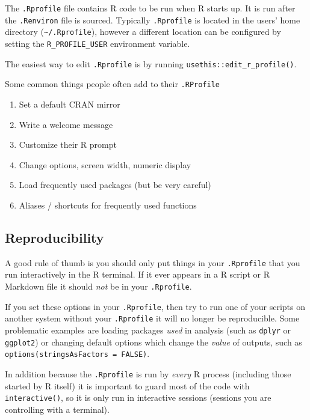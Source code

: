 \documentclass[
  letterpaper,
]{book}
\providecommand{\tightlist}{%
  \setlength{\itemsep}{0pt}\setlength{\parskip}{0pt}}\usepackage{longtable,booktabs,array}
\begin{document}
The \texttt{.Rprofile} file contains R code to be run when R starts up.
It is run after the \texttt{.Renviron} file is sourced. Typically
\texttt{.Rprofile} is located in the users' home directory
(\texttt{\textasciitilde{}/.Rprofile}), however a different location can
be configured by setting the \texttt{R\_PROFILE\_USER} environment
variable.

The easiest way to edit \texttt{.Rprofile} is by running
\texttt{usethis::edit\_r\_profile()}.

Some common things people often add to their \texttt{.RProfile}

\begin{enumerate}
\def\labelenumi{\arabic{enumi}.}
\tightlist
\item
  Set a default CRAN mirror
\item
  Write a welcome message
\item
  Customize their R prompt
\item
  Change options, screen width, numeric display
\item
  Load frequently used packages (but be very careful)
\item
  Aliases / shortcuts for frequently used functions
\end{enumerate}

\hypertarget{reproducibility}{%
\subsection{Reproducibility}\label{reproducibility}}

A good rule of thumb is you should only put things in your
\texttt{.Rprofile} that you run interactively in the R terminal. If it
ever appears in a R script or R Markdown file it should \emph{not} be in
your \texttt{.Rprofile}.

If you set these options in your \texttt{.Rprofile}, then try to run one
of your scripts on another system without your \texttt{.Rprofile} it
will no longer be reproducible. Some problematic examples are loading
packages \emph{used} in analysis (such as \texttt{dplyr} or
\texttt{ggplot2}) or changing default options which change the
\emph{value} of outputs, such as
\texttt{options(stringsAsFactors\ =\ FALSE)}.

In addition because the \texttt{.Rprofile} is run by \emph{every} R
process (including those started by R itself) it is important to guard
most of the code with \texttt{interactive()}, so it is only run in
interactive sessions (sessions you are controlling with a terminal).
\end{document}
